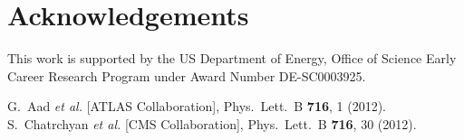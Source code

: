 \documentclass[aps,prl,twocolumn,preprintnumbers,groupedaddress,nofootinbib]{revtex4}
\begin{document}
\section*{Acknowledgements}
 
This work is supported by the US Department of Energy, Office of Science Early Career Research Program under Award Number DE-SC0003925.

\begin{thebibliography}{99}
  G.~Aad {\it et al.}  [ATLAS Collaboration],
  Phys.\ Lett.\ B {\bf 716}, 1 (2012).
  S.~Chatrchyan {\it et al.}  [CMS Collaboration],
  Phys.\ Lett.\ B {\bf 716}, 30 (2012).
  

\end{thebibliography}
\end{document}

